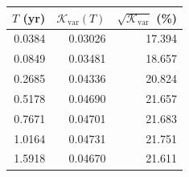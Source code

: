 \begin{tabular}{rrr}
\toprule
$T$ (yr) & $\mathcal{K}_{\mathrm{var}}(T)$ & $\sqrt{\mathcal{K}_{\mathrm{var}}}$ (\%)\\
\midrule
0.0384 & 0.03026 & 17.394\\
0.0849 & 0.03481 & 18.657\\
0.2685 & 0.04336 & 20.824\\
0.5178 & 0.04690 & 21.657\\
0.7671 & 0.04701 & 21.683\\
1.0164 & 0.04731 & 21.751\\
1.5918 & 0.04670 & 21.611\\
\bottomrule
\end{tabular}
